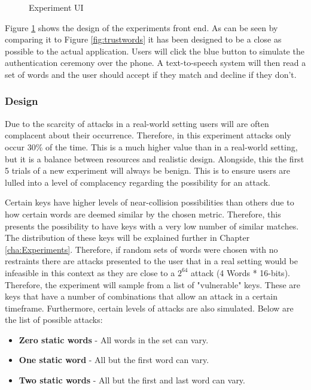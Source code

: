 \begin{figure}[h!]
    \centering
    \caption{Experiment UI}
    \label{fig:expID}
\end{figure}

Figure \ref{fig:expID} shows the design of the experiments front end. As can be seen by comparing it to Figure \ref{fig:trustwords} it has been designed to be a close as possible to the actual application. Users will click the blue button to simulate the authentication ceremony over the phone. A text-to-speech system will then read a set of words and the user should accept if they match and decline if they don't.

\subsubsection{Design}

Due to the scarcity of attacks in a real-world setting users will are often complacent about their occurrence. Therefore, in this experiment attacks only occur 30\% of the time. This is a much higher value than in a real-world setting, but it is a balance between resources and realistic design. Alongside, this the first 5 trials of a new experiment will always be benign. This is to ensure users are lulled into a level of complacency regarding the possibility for an attack.

Certain keys have higher levels of near-collision possibilities than others due to how certain words are deemed similar by the chosen metric. Therefore, this presents the possibility to have keys with a very low number of similar matches. The distribution of these keys will be explained further in Chapter \ref{cha:Experiments}. Therefore, if random sets of words were chosen with no restraints there are attacks presented to the user that in a real setting would be infeasible in this context as they are close to a $2^{64}$ attack (4 Words * 16-bits). Therefore, the experiment will sample from a list of "vulnerable" keys. These are keys that have a number of combinations that allow an attack in a certain timeframe. Furthermore, certain levels of attacks are also simulated. Below are the list of possible attacks:

\begin{itemize}
    \item \textbf{Zero static words} - All words in the set can vary.
    \item \textbf{One static word} - All but the first word can vary.
    \item \textbf{Two static words} - All but the first and last word can vary.
\end{itemize}

